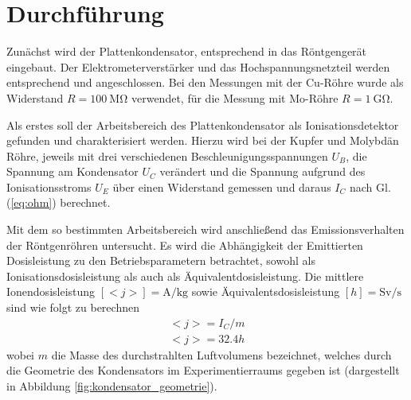 

\section{Durchführung}

Zunächst wird der Plattenkondensator, entsprechend \cite[3]{LDdosimetrie} in das Röntgengerät eingebaut. Der Elektrometerverstärker und das Hochspannungsnetzteil werden entsprechend \cite[2]{LDelektrometer} und \cite[2-3]{529va} angeschlossen. Bei den Messungen mit der Cu-Röhre wurde als Widerstand $R=\SI{100}{\mega\ohm}$ verwendet, für die Messung mit Mo-Röhre $R=\SI{1}{\giga\ohm}$.


Als erstes soll der Arbeitsbereich des Plattenkondensator als Ionisationsdetektor gefunden und charakterisiert werden. Hierzu wird bei der Kupfer und Molybdän Röhre, jeweils mit drei verschiedenen Beschleunigungsspannungen $U_B$, die Spannung am Kondensator $U_C$ verändert und die Spannung aufgrund des Ionisationsstroms $U_E$ über einen Widerstand gemessen und daraus $I_C$ nach Gl. (\ref{eq:ohm}) berechnet.

Mit dem so bestimmten Arbeitsbereich wird anschließend das Emissionsverhalten der Röntgenröhren untersucht. Es wird die Abhängigkeit der Emittierten Dosisleistung zu den Betriebsparametern betrachtet, sowohl als Ionisationsdosisleistung als auch als Äquivalentdosisleistung.
Die mittlere Ionendosisleistung $[<j>] = \unit{\ampere\per\kilo\gram}$ sowie Äquivalentsdosisleistung $[h] = \unit{\sievert\per\second}$ sind wie folgt zu berechnen \cite[4-5]{529va}
\begin{align}
	<j> = I_C / m \label{eq:ion_dose_rate}\\
	<j> = 32.4 h
\end{align}
wobei $m$ die Masse des durchstrahlten Luftvolumens bezeichnet, welches durch die Geometrie des Kondensators im Experimentierraums gegeben ist (dargestellt in Abbildung \ref{fig:kondensator_geometrie}).



